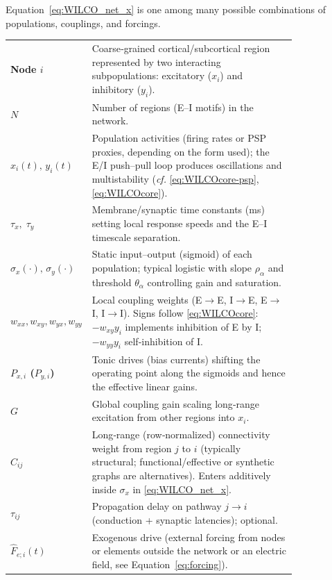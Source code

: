 \documentclass[11pt]{article}
\numberwithin{equation}{section}
\begin{document}
Equation~\ref{eq:WILCO_net_x} is one among many possible combinations of populations, couplings, and forcings.

\begin{tcolorbox}[
  colback=gray!5,
  colframe=slate,
  colbacktitle=softblue!25,
  coltitle=softblue!60!black,
  fonttitle=\bfseries\small,
  title={\small \textit{Wilson-Cowan Network (Eq.~\ref{eq:WILCO_net_x})} \\ Whole-brain Simulations Parameters \& Physiological Meaning},
  boxrule=0.4pt, enhanced, sharp corners,
  left=4pt,right=4pt,top=3pt,bottom=3pt,
  boxsep=2pt, before skip=6pt, after skip=6pt
]
\scriptsize
\begin{tabular}{@{}l p{0.82\linewidth}@{}}
\textbf{Node $i$} & Coarse‑grained cortical/subcortical region represented by two interacting subpopulations: excitatory ($x_i$) and inhibitory ($y_i$).\\
\textbf{$N$} & Number of regions (E–I motifs) in the network.\\
\textbf{$x_i(t),\,y_i(t)$} & Population activities (firing rates or PSP proxies, depending on the form used); the E/I push–pull loop produces oscillations and multistability (\emph{cf.} \eqref{eq:WILCOcore-psp}, \eqref{eq:WILCOcore}).\\
\textbf{$\tau_x,\;\tau_y$} & Membrane/synaptic time constants (ms) setting local response speeds and the E–I timescale separation.\\
\textbf{$\sigma_x(\cdot),\,\sigma_y(\cdot)$} & Static input–output (sigmoid) of each population; typical logistic with slope $\rho_{\alpha}$ and threshold $\theta_{\alpha}$ controlling gain and saturation.\\
\textbf{$w_{xx},w_{xy},w_{yx},w_{yy}$} & Local coupling weights (E$\to$E, I$\to$E, E$\to$I, I$\to$I). Signs follow \eqref{eq:WILCOcore}: $-w_{xy}y_i$ implements inhibition of E by I; $-w_{yy}y_i$ self‑inhibition of I.\\
\textbf{$P_{x,i}$ ($P_{y,i}$)} & Tonic drives (bias currents) shifting the operating point along the sigmoids and hence the effective linear gains.\\
\textbf{$G$} & Global coupling gain scaling long‑range excitation from other regions into $x_i$.\\
\textbf{$C_{ij}$} & Long‑range (row‑normalized) connectivity weight from region $j$ to $i$ (typically structural; functional/effective or synthetic graphs are alternatives). Enters additively inside $\sigma_x$ in \eqref{eq:WILCO_net_x}.\\
\textbf{$\tau_{ij}$} & Propagation delay on pathway $j{\to}i$ (conduction + synaptic latencies); optional.\\
\textbf{$\hat F_{e;i}(t)$}& Exogenous drive  (external forcing from nodes or elements outside the network or an electric field, see Equation~\ref{eq:forcing}). 
\end{tabular}
\end{tcolorbox}
\end{document}
